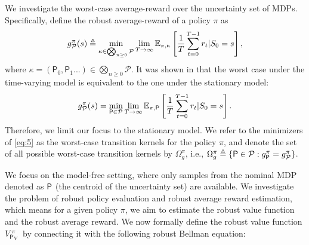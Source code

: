 We investigate the worst-case average-reward over the uncertainty set of MDPs. Specifically, define the  robust average-reward of a policy $\pi$ as 
\begin{align}\label{eq:Vdef}
    g^\pi_{\mathcal{P}}(s)\triangleq \min_{\kappa\in\bigotimes_{n\geq 0} \mathcal{P}} \lim_{T\to\infty}\mathbb{E}_{\pi,\kappa}\left[\frac{1}{T}\sum^{T-1}_{t=0}r_t|S_0=s\right],
\end{align}
where $\kappa=(\mathsf P_0,\mathsf P_1...)\in\bigotimes_{n\geq 0} \mathcal{P}$. It was shown in \citep{wang2023robust} that the worst case under the time-varying model is equivalent to the one under the stationary model:
\begin{align}\label{eq:5}
    g^\pi_{\mathcal{P}}(s)= \min_{\mathsf P\in\mathcal{P}} \lim_{T\to\infty}\mathbb{E}_{\pi,\mathsf P}\left[\frac{1}{T}\sum^{T-1}_{t=0}r_t|S_0=s\right].
\end{align}
Therefore, we limit our focus to the stationary model. We refer to the minimizers of \eqref{eq:5} as the worst-case transition kernels for the policy $\pi$, and denote the set of all possible worst-case transition kernels by $\Omega^\pi_g$, i.e., $\Omega^\pi_g \triangleq \{\mathsf P\in\mathcal{P}: g^\pi_\mathsf P=g^\pi_{\mathcal{P}} \}$.

We focus on the model-free setting, where only samples from the nominal MDP denoted as $\mathsf P$ (the centroid of the uncertainty set) are available. We investigate the problem of robust policy evaluation and robust average reward estimation, which means for a given policy $\pi$, we aim to estimate the robust value function and the robust average reward. We now formally define the robust value function $ V^\pi_{\mathsf P_V}$ by connecting it with the following robust Bellman equation: 

